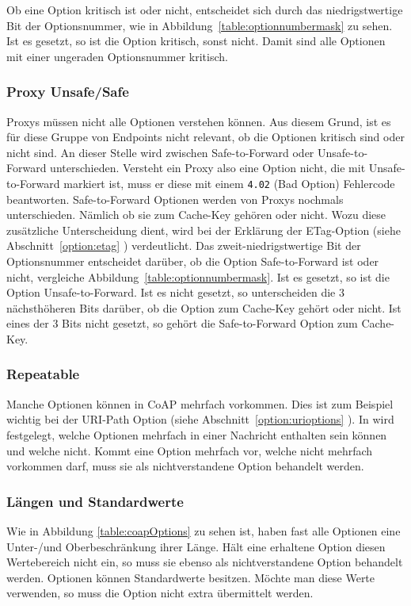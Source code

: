 Ob eine Option kritisch ist oder nicht, entscheidet sich durch das niedrigstwertige Bit der
Optionsnummer, wie in Abbildung~\ref{table:optionnumbermask} zu sehen. Ist es gesetzt, so ist die Option kritisch, sonst nicht. Damit sind alle Optionen mit
einer ungeraden Optionsnummer kritisch.

\subsubsection{Proxy Unsafe/Safe}
Proxys müssen nicht alle Optionen verstehen können. Aus diesem Grund, ist es für diese Gruppe von
Endpoints nicht relevant, ob die Optionen kritisch sind oder nicht sind. An dieser Stelle wird
zwischen Safe-to-Forward oder Unsafe-to-Forward unterschieden. Versteht ein Proxy also eine Option
nicht, die mit Unsafe-to-Forward markiert ist, muss er diese mit einem \verb!4.02! (Bad Option)
Fehlercode beantworten.
Safe-to-Forward Optionen werden von Proxys nochmals unterschieden. Nämlich ob sie zum Cache-Key gehören oder
nicht.
Wozu diese zusätzliche Unterscheidung dient, wird bei der Erklärung der ETag-Option (siehe Abschnitt~\ref{option:etag} )
verdeutlicht.
Das zweit-niedrigstwertige Bit der Optionsnummer entscheidet darüber, ob die Option Safe-to-Forward
ist oder nicht, vergleiche Abbildung~\ref{table:optionnumbermask}. Ist es gesetzt, so ist die Option Unsafe-to-Forward. Ist es nicht gesetzt, so
unterscheiden die 3 nächsthöheren Bits darüber, ob die Option zum Cache-Key gehört oder nicht. Ist
eines der 3 Bits nicht gesetzt, so gehört die Safe-to-Forward Option zum Cache-Key.

\subsubsection{Repeatable}
Manche Optionen können in \ac{CoAP} mehrfach vorkommen. Dies ist zum Beispiel wichtig bei der
\ac{URI}-Path Option (siehe Abschnitt~\ref{option:urioptions} ).
In \cite{draft-ietf-core-coap-13} wird festgelegt, welche Optionen mehrfach in einer Nachricht
enthalten sein können und welche nicht.
Kommt eine Option mehrfach vor, welche nicht mehrfach vorkommen darf, muss sie als nichtverstandene
Option behandelt werden.

\subsubsection{Längen und Standardwerte}
Wie in Abbildung \ref{table:coapOptions} zu sehen ist, haben fast alle Optionen
eine Unter-/und Oberbeschränkung ihrer Länge. Hält eine erhaltene Option diesen
Wertebereich nicht ein, so muss sie ebenso als nichtverstandene Option behandelt
werden.
Optionen können Standardwerte besitzen. Möchte man diese Werte verwenden, so
muss die Option nicht extra übermittelt werden.
